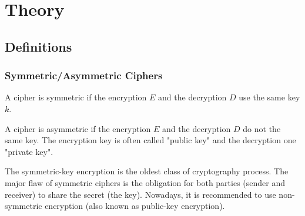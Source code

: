 \chapter{Theory}

\section{Definitions}


\subsection{Symmetric/Asymmetric Ciphers}

\begin{mydef}
\begin{minipage}[t]{0.8\textwidth}
    A cipher is symmetric if the encryption $E$ and the decryption $D$ use the same key $k$.
\end{minipage}
\end{mydef}

\begin{mydef}
\begin{minipage}[t]{0.8\textwidth}
    A cipher is asymmetric if the encryption $E$ and the decryption $D$ do not the same key. The encryption key is often called "public key" and the decryption one "private key".
\end{minipage}
\end{mydef}

The symmetric-key encryption is the oldest class of cryptography process. The major flaw of symmetric ciphers is the obligation for both parties (sender and receiver) to share the secret (the key). Nowadays, it is recommended to use non-symmetric encryption (also known as public-key encryption).




